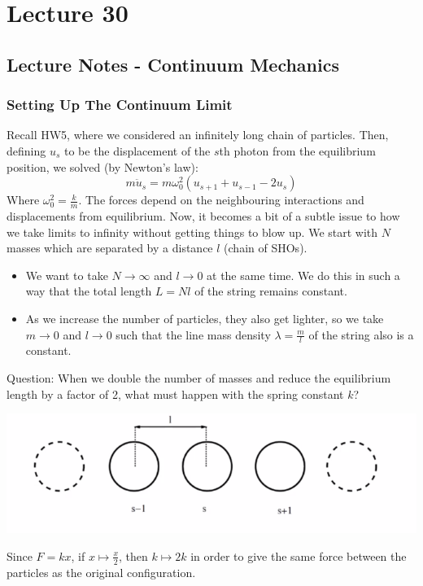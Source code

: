 \section{Lecture 30}
\subsection{Lecture Notes - Continuum Mechanics}
\subsubsection{Setting Up The Continuum Limit}
Recall HW5, where we considered an infinitely long chain of particles. Then, defining $u_s$ to be the displacement of the $s$th photon from the equilibrium position, we solved (by Newton's law):
\[m\ddot{u}_s = m\omega_0^2(u_{s+1} + u_{s-1} - 2u_s)\]
Where $\omega_0^2 = \frac{k}{m}$. The forces depend on the neighbouring interactions and displacements from equilibrium. Now, it becomes a bit of a subtle issue to how we take limits to infinity without getting things to blow up.
\newline We start with $N$ masses which are separated by a distance $l$ (chain of SHOs).
\begin{itemize}
    \item  We want to take $N \rightarrow \infty$ and $l \rightarrow 0$ at the same time. We do this in such a way that the total length $L = Nl$ of the string remains constant.
    \item  As we increase the number of particles, they also get lighter, so we take $m \rightarrow 0$ and $l \rightarrow 0$ such that the line mass density $\lambda = \frac{m}{l}$ of the string also is a constant.
\end{itemize}
Question: When we double the number of masses and reduce the equilibrium length by a factor of 2, what must happen with the spring constant $k$?
\begin{center}
    \includegraphics[scale=1]{Lecture-30/l30-img1.png}
\end{center}
\begin{s}
Since $F = kx$, if $x \mapsto \frac{x}{2}$, then $k \mapsto 2k$ in order to give the same force between the particles as the original configuration. 
\end{s}
